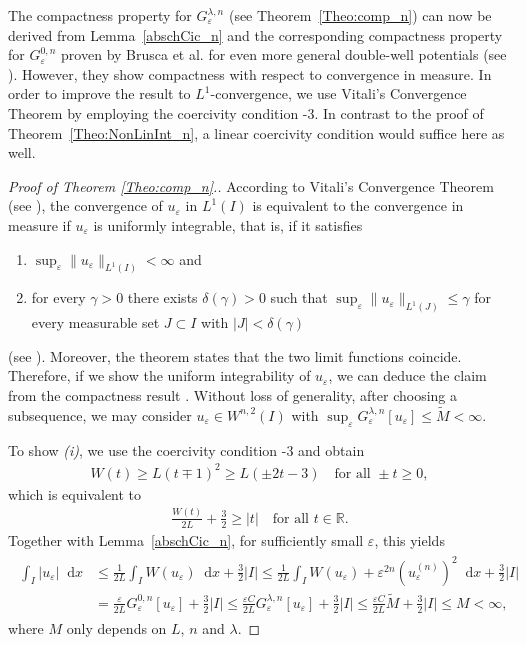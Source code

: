 \documentclass{article}
\newcommand{\dd}{\mathop{}\mathrm{d}} %
\newcommand{\lam}{\lambda}
\newcommand{\eps}{\varepsilon}
\newcommand{\eni}{\textit{(i)}}
\newcommand{\enii}{\textit{(ii)}}
\numberwithin{figure}{section}
\newcommand{\R}{\mathbb{R}}
\numberwithin{equation}{section}
\begin{document}
 The compactness property for $G_\eps^{\lam,n}$ (see Theorem~\ref{Theo:comp_n}) can now be derived from Lemma~\ref{abschCic_n} and the corresponding compactness property for $G_\eps^{0,n}$ proven by Brusca et al. for even more general double-well potentials (see {\cite[Proposition~5.1]{BruDonSol}}). However, they show compactness with respect to convergence in measure. In order to improve the result to $L^1$-convergence, we use Vitali's Convergence Theorem by employing the coercivity condition \hyp3. In contrast to the proof of Theorem~\ref{Theo:NonLinInt_n}, a linear coercivity condition would suffice here as well.

\begin{proof}[Proof of Theorem \ref{Theo:comp_n}.]
    According to Vitali's Convergence Theorem (see \cite[Satz 6.25]{Klenke}), the convergence of $u_\eps$ in $L^1(I)$ is equivalent to the convergence in measure if $u_\eps$ is uniformly integrable, that is, if it satisfies
        \begin{enumerate}
        \item[\eni] $\sup_{\eps} \|u_\eps\|_{L^1(I)} < \infty$ and
        \item[\enii] for every $\gamma>0$ there exists $\delta(\gamma)>0$ such that $\sup_\eps \|u_\eps\|_{L^1(J)} \leq \gamma$ for every measurable set $J \subset I$ with $|J| < \delta(\gamma)$
        \end{enumerate}
    (see \cite[Satz 6.24]{Klenke}). Moreover, the theorem states that the two limit functions coincide. Therefore, if we show the uniform integrability of $u_\eps$, we can deduce the claim from the compactness result \cite[Proposition 5.1]{BruDonSol}. Without loss of generality, after choosing a subsequence, we may consider $u_\eps \in W^{n,2}(I)$ with $\sup_\eps G_\eps^{\lam,n}[u_\eps] \leq \tilde{M} < \infty$.

    To show \eni, we use the coercivity condition \hyp3 and obtain
    \begin{align}
        W(t) \geq L(t \mp 1)^2 \geq L(\pm 2t-3) \quad \text{for all } \pm t \geq 0,
    \end{align}
    which is equivalent to
    \begin{align}
        \frac{W(t)}{2L} + \frac 32 \geq |t| \quad  \text{for all } t \in \R.
    \end{align}
    Together with Lemma~\ref{abschCic_n}, for sufficiently small $\eps$, this yields
    \begin{align} \label{viatliabsch}
    \begin{split}
        \int_I |u_\eps|\dd x
        & \leq \frac 1{2L} \int_I W(u_\eps)\dd x + \frac 32 |I| 
        \leq \frac 1{2L} \int_I W(u_\eps) + \eps^{2n} (u_\eps^{(n)})^2\dd x + \frac 32 |I| \\
        & = \frac \eps{2L} G_\eps^{0,n}[u_\eps] + \frac 32 |I|
        \leq \frac {\eps C}{2L} G_\eps^{\lam,n}[u_\eps] + \frac 32 |I|
        \leq \frac {\eps C}{2L} \tilde{M} + \frac 32 |I| \leq M < \infty,
    \end{split}
    \end{align}
    where $M$ only depends on $L$, $n$ and $\lam$.


\end{proof}
\end{document}

